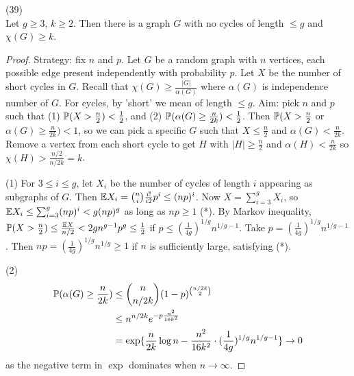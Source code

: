 \documentclass[a4paper]{article}
\begin{document}
\begin{thm} (39)\\
Let $g \geq 3$, $k \geq 2$. Then there is a graph $G$ with no cycles of length $\leq g$ and $\chi(G) \geq k$.
\begin{proof}
Strategy: fix $n$ and $p$. Let $G$ be a random graph with $n$ vertices, each possible edge present independently with probability $p$. Let $X$ be the number of short cycles in $G$. Recall that $\chi(G) \geq \frac{|G|}{\alpha(G)}$ where $\alpha(G)$ is independence number of $G$. For cycles, by 'short' we mean of length $\leq g$. Aim: pick $n$ and $p$ such that (1) $\P(X > \frac{n}{2}) < \frac{1}{2}$, and (2) $\P(\alpha(G) \geq \frac{n}{2k}) < \frac{1}{2}$. Then $\P(X > \frac{n}{2}$ or $\alpha(G) \geq \frac{n}{2k}) < 1$, so we can pick a specific $G$ such that $X \leq \frac{n}{2}$ and $\alpha(G) < \frac{n}{2k}$. Remove a vertex from each short cycle to get $H$ with $|H| \geq \frac{n}{2}$ and $\alpha(H) < \frac{n}{2k}$ so $\chi(H) > \frac{n/2}{n/2k} = k$.

(1) For $3 \leq i \leq g$, let $X_i$ be the number of cycles of length $i$ appearing as subgraphs of $G$. Then $\E X_i = {n \choose i} \frac{i!}{i2}p^i \leq (np)^i$. Now $X = \sum_{i=3}^g X_i$, so $\E X_i \leq \sum_{i=3}^g (np)^i < g(np)^g$ as long as $np \geq 1$ (*). By Markov inequality, $\P(X > \frac{n}{2}) \leq \frac{\E X}{n/2} < 2gn^{g-1} p^g \leq \frac{1}{2}$ if $p \leq (\frac{1}{4g})^{1/g} n^{1/g-1}$. Take $p = (\frac{1}{4g})^{1/g} n^{1/g-1}$. Then $np = (\frac{1}{4g})^{1/g} n^{1/g} \geq 1$ if $n$ is sufficiently large, satisfying (*).

(2)
\begin{equation*}
\begin{aligned}
\P(\alpha(G) \geq \frac{n}{2k}) &\leq {n \choose n/2k} (1-p)^{n/2k \choose 2}\\
&\leq n^{n/2k} e^{-p\frac{n^2}{16k^2}}\\
&= \exp\{\frac{n}{2k} \log n - \frac{n^2}{16k^2} \cdot (\frac{1}{4g})^{1/g} n^{1/g-1}\} \to 0
\end{aligned}
\end{equation*}
as the negative term in $\exp$ dominates when $n \to \infty$.
\end{proof}
\end{thm}
\end{document}
